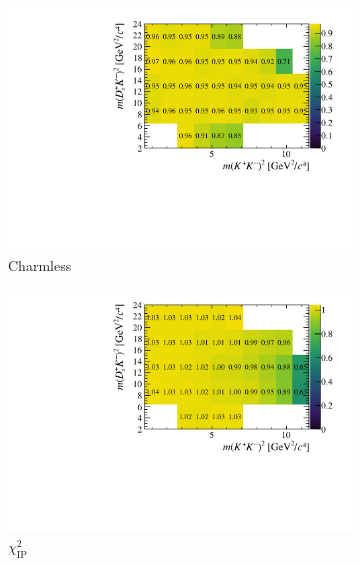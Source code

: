 \begin{figure}[!h]
\begin{subfigure}[t]{0.40\textwidth}
        \includegraphics[width=1.0\textwidth]{figs/B2DsKK/Relative_Eff_FDCHI2_All.pdf}
        \caption{Charmless}
        \label{fig:B2DsKK_releff_charmless}
    \end{subfigure}
    \begin{subfigure}[t]{0.40\textwidth}
        \includegraphics[width=1.0\textwidth]{figs/B2DsKK/Relative_Eff_Bcut_All.pdf}
        \caption{$\chi^{2}_{\text{IP}}$}
        \label{fig:B2DsKK_releff_ipchi2}
    \end{subfigure}
    \begin{subfigure}[t]{0.40\textwidth}

\end{subfigure}
\end{figure}
